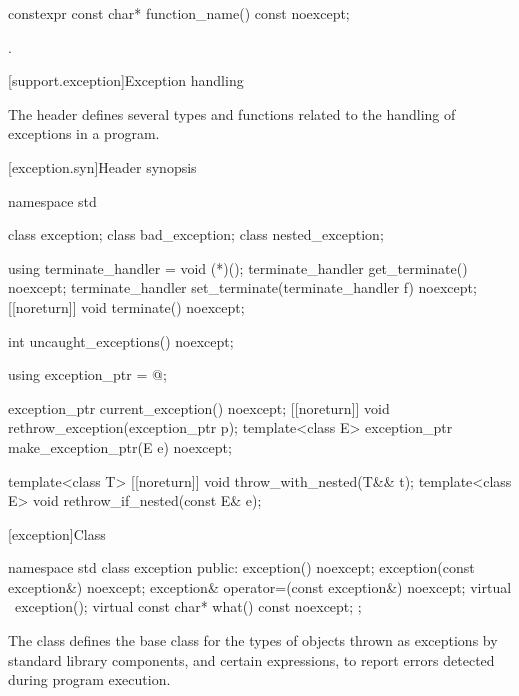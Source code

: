 \begin{itemdecl}
constexpr const char* function_name() const noexcept;
\end{itemdecl}
\begin{itemdescr}
\pnum
\returns
{}.
\end{itemdescr}

[support.exception]{Exception handling}

\pnum
The header 
defines several types and functions related to the handling of exceptions in a \Cpp{} program.

[exception.syn]{Header  synopsis}

\begin{codeblock}
namespace std {
  class exception;
  class bad_exception;
  class nested_exception;

  using terminate_handler = void (*)();
  terminate_handler get_terminate() noexcept;
  terminate_handler set_terminate(terminate_handler f) noexcept;
  [[noreturn]] void terminate() noexcept;

  int uncaught_exceptions() noexcept;

  using exception_ptr = @\unspec@;

  exception_ptr current_exception() noexcept;
  [[noreturn]] void rethrow_exception(exception_ptr p);
  template<class E> exception_ptr make_exception_ptr(E e) noexcept;

  template<class T> [[noreturn]] void throw_with_nested(T&& t);
  template<class E> void rethrow_if_nested(const E& e);
}
\end{codeblock}

[exception]{Class }

%
%
\begin{codeblock}
namespace std {
  class exception {
  public:
    exception() noexcept;
    exception(const exception&) noexcept;
    exception& operator=(const exception&) noexcept;
    virtual ~exception();
    virtual const char* what() const noexcept;
  };
}
\end{codeblock}

\pnum
The class
defines the base
class for the types of objects thrown as exceptions by
\Cpp{} standard library components, and certain
expressions, to report errors detected during program execution.

